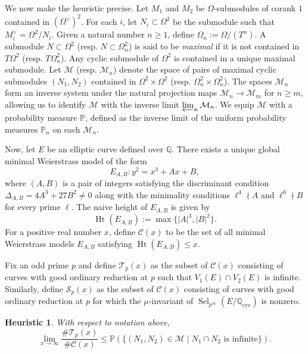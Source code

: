 \documentclass[12pt]{amsart}
\newtheorem{heuristic}[theorem]{Heuristic}
\numberwithin{equation}{section}
\begin{document}
We now make the heuristic precise. Let \( M_1 \) and \( M_2 \) be \(\Omega\)-submodules of corank \(1\) contained in \((\Omega^\vee)^2\). For each \( i \), let \( N_i \subset \Omega^2 \) be the submodule such that \( M_i^\vee = \Omega^2 / N_i \). Given a natural number \( n \geq 1 \), define \( \Omega_n := \Omega / (T^n) \). A submodule \( N \subset \Omega^2 \) (resp. \( N \subset \Omega_n^2 \)) is said to be \emph{maximal} if it is not contained in \( T\Omega^2 \) (resp. $T\Omega_n^2$). Any cyclic submodule of $\Omega^2$ is contained in a unique maximal submodule. Let \( \mathcal{M} \) (resp. \( \mathcal{M}_n \)) denote the space of pairs of maximal cyclic submodules \( (N_1, N_2) \) contained in \( \Omega^2 \times \Omega^2 \) (resp. \( \Omega_n^2 \times \Omega_n^2 \)). The spaces \( \mathcal{M}_n \) form an inverse system under the natural projection maps \( \mathcal{M}_n \to \mathcal{M}_m \) for \( n \geq m \), allowing us to identify \( \mathcal{M} \) with the inverse limit \( \varprojlim_n \mathcal{M}_n \). We equip \( \mathcal{M} \) with a probability measure \( \mathbb{P} \), defined as the inverse limit of the uniform probability measures \( \mathbb{P}_n \) on each \( \mathcal{M}_n \).  

Now, let \( E \) be an elliptic curve defined over \( \mathbb{Q} \). There exists a unique global minimal Weierstrass model of the form  
\[
E_{A,B} : y^2 = x^3 + A x + B,
\]
where \( (A, B) \) is a pair of integers satisfying the discriminant condition \( \Delta_{A,B} = 4A^3 + 27B^2 \neq 0 \) along with the minimality conditions \( \ell^4 \nmid A \) and \( \ell^6 \nmid B \) for every prime \( \ell \). The naive height of \( E_{A,B} \) is given by  
\[
\operatorname{Ht}(E_{A,B}) := \max \{ |A|^3, |B|^2 \}.
\]
For a positive real number \( x \), define \( \mathcal{C}(x) \) to be the set of all minimal Weierstrass models \( E_{A,B} \) satisfying \( \operatorname{Ht}(E_{A,B}) \leq x \).  

Fix an odd prime \( p \) and define \( \mathcal{T}_p(x) \) as the subset of \( \mathcal{C}(x) \) consisting of curves with good ordinary reduction at \( p \) such that \( V_1(E) \cap V_2(E) \) is infinite. Similarly, define \( \mathcal{S}_p(x) \) as the subset of \( \mathcal{C}(x) \) consisting of curves with good ordinary reduction at \( p \) for which the \( \mu \)-invariant of \( \operatorname{Sel}_{p^\infty}(E/\mathbb{Q}_{\mathrm{cyc}}) \) is nonzero.
\begin{heuristic}\label{heuristic main}
    With respect to notation above,
    \[\lim_{x\rightarrow\infty} \frac{\# \mathcal{T}_p(x)}{\# \mathcal{C}(x)}\leq \mathbb{P}\left(\{(N_1, N_2)\in \mathcal{M}\mid N_1\cap N_2\text{ is infinite}\}\right).\]
\end{heuristic}
\end{document}
